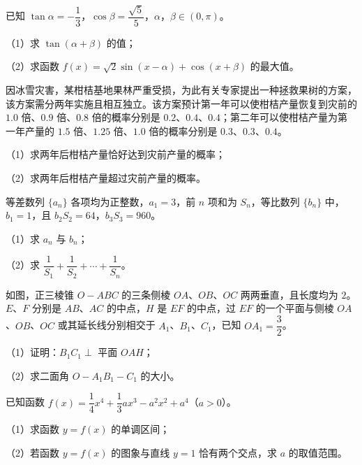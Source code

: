 \begin{question}
已知 $\tan\alpha=-\dfrac13$，$\cos\beta=\dfrac{\sqrt5}5$，$\alpha$，$\beta\in(0,\pi)$。

（1）求 $\tan(\alpha+\beta)$ 的值；

（2）求函数 $f(x)=\sqrt2\sin(x-\alpha)+\cos(x+\beta)$ 的最大值。

\end{question}
\begin{question}
因冰雪灾害，某柑桔基地果林严重受损，为此有关专家提出一种拯救果树的方案，该方案需分两年实施且相互独立。该方案预计第一年可以使柑桔产量恢复到灾前的 $1.0$ 倍、$0.9$ 倍、$0.8$ 倍的概率分别是 $0.2$、$0.4$、$0.4$；第二年可以使柑桔产量为第一年产量的 $1.5$ 倍、$1.25$ 倍、$1.0$ 倍的概率分别是 $0.3$、$0.3$、$0.4$。

（1）求两年后柑桔产量恰好达到灾前产量的概率；

（2）求两年后柑桔产量超过灾前产量的概率。

\end{question}
\begin{question}
等差数列 $\{a_n\}$ 各项均为正整数，$a_1=3$，前 $n$ 项和为 $S_n$，等比数列 $\{b_n\}$ 中，$b_1=1$，且 $b_2S_2=64$，$b_3S_3=960$。

（1）求 $a_n$ 与 $b_n$；

（2）求 $\dfrac1{S_1}+\dfrac1{S_2}+\cdots+\dfrac1{S_n}$。

\Needspace{0.4\textheight}
\end{question}
\begin{question}
如图，正三棱锥 $O-ABC$ 的三条侧棱 $OA$、$OB$、$OC$ 两两垂直，且长度均为 $2$。$E$、$F$ 分别是 $AB$、$AC$ 的中点，$H$ 是 $EF$ 的中点，过 $EF$ 的一个平面与侧棱 $OA$、$OB$、$OC$ 或其延长线分别相交于 $A_1$、$B_1$、$C_1$，已知 $OA_1=\dfrac32$。

（1）证明：$B_1C_1\perp$ 平面 $OAH$；

（2）求二面角 $O-A_1B_1-C_1$ 的大小。
\nopagebreak[4]
\begin{center}\end{center}
\nopagebreak[4]
\end{question}
\begin{question}
已知函数 $f(x)=\dfrac14x^4+\dfrac13ax^3-a^2x^2+a^4$（$a>0$）。

（1）求函数 $y=f(x)$ 的单调区间；

（2）若函数 $y=f(x)$ 的图象与直线 $y=1$ 恰有两个交点，求 $a$ 的取值范围。

\Needspace{0.4\textheight}
\end{question}
